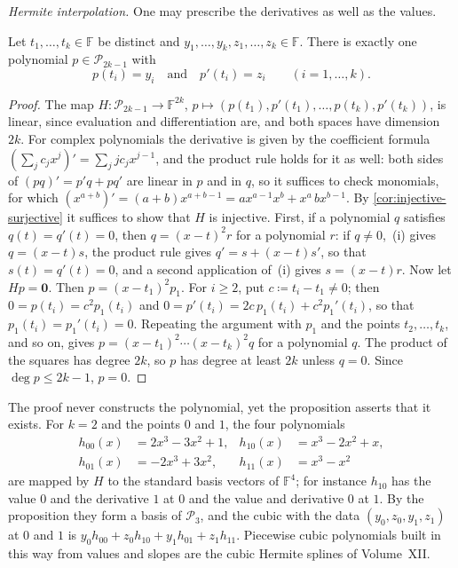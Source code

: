 \emph{Hermite interpolation.} One may prescribe the derivatives as well as the values.

\begin{proposition}
\label{prop:hermite}
Let $t_1,\ldots,t_k\in\mathbb F$ be distinct and $y_1,\ldots,y_k,z_1,\ldots,z_k\in\mathbb F$. There is exactly one polynomial $p\in\mathcal P_{2k-1}$ with
\[
p(t_i)=y_i\quad\text{and}\quad p'(t_i)=z_i\qquad(i=1,\ldots,k).
\]
\end{proposition}

\begin{proof}
The map $H\colon\mathcal P_{2k-1}\to\mathbb F^{2k}$, $p\mapsto(p(t_1),p'(t_1),\ldots,p(t_k),p'(t_k))$, is linear, since evaluation and differentiation are, and both spaces have dimension $2k$. For complex polynomials the derivative is given by the coefficient formula $(\sum_jc_jx^j)'=\sum_jjc_jx^{j-1}$, and the product rule holds for it as well: both sides of $(pq)'=p'q+pq'$ are linear in $p$ and in $q$, so it suffices to check monomials, for which $(x^{a+b})'=(a+b)x^{a+b-1}=ax^{a-1}x^b+x^a\,bx^{b-1}$. By \cref{cor:injective-surjective} it suffices to show that $H$ is injective. First, if a polynomial $q$ satisfies $q(t)=q'(t)=0$, then $q=(x-t)^2r$ for a polynomial $r$: if $q\ne0$, \,(i) gives $q=(x-t)s$, the product rule gives $q'=s+(x-t)s'$, so that $s(t)=q'(t)=0$, and a second application of \,(i) gives $s=(x-t)r$. Now let $Hp=\mathbf 0$. Then $p=(x-t_1)^2p_1$. For $i\ge2$, put $c\coloneqq t_i-t_1\ne0$; then $0=p(t_i)=c^2p_1(t_i)$ and $0=p'(t_i)=2c\,p_1(t_i)+c^2p_1'(t_i)$, so that $p_1(t_i)=p_1'(t_i)=0$. Repeating the argument with $p_1$ and the points $t_2,\ldots,t_k$, and so on, gives $p=(x-t_1)^2\cdots(x-t_k)^2q$ for a polynomial $q$. The product of the squares has degree $2k$, so $p$ has degree at least $2k$ unless $q=0$. Since $\deg p\le2k-1$, $p=0$.
\end{proof}

The proof never constructs the polynomial, yet the proposition asserts that it exists. For $k=2$ and the points $0$ and $1$, the four polynomials
\[
\begin{aligned}
h_{00}(x)&=2x^3-3x^2+1,&h_{10}(x)&=x^3-2x^2+x,\\
h_{01}(x)&=-2x^3+3x^2,&h_{11}(x)&=x^3-x^2
\end{aligned}
\]
are mapped by $H$ to the standard basis vectors of $\mathbb F^4$; for instance $h_{10}$ has the value $0$ and the derivative $1$ at $0$ and the value and derivative $0$ at $1$. By the proposition they form a basis of $\mathcal P_3$, and the cubic with the data $(y_0,z_0,y_1,z_1)$ at $0$ and $1$ is $y_0h_{00}+z_0h_{10}+y_1h_{01}+z_1h_{11}$. Piecewise cubic polynomials built in this way from values and slopes are the cubic Hermite splines of Volume~XII.

